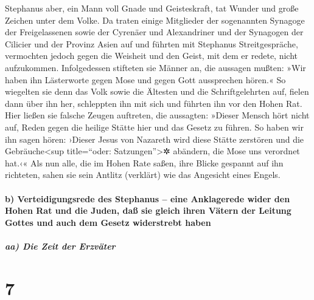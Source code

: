  Stephanus aber, ein Mann voll Gnade und Geisteskraft, tat
Wunder und große Zeichen unter dem Volke.  Da traten
einige Mitglieder der sogenannten Synagoge der Freigelassenen sowie der
Cyrenäer und Alexandriner und der Synagogen der Cilicier und der Provinz
Asien auf und führten mit Stephanus Streitgespräche, 
vermochten jedoch gegen die Weisheit und den Geist, mit dem er redete,
nicht aufzukommen.  Infolgedessen stifteten sie Männer
an, die aussagen mußten: »Wir haben ihn Lästerworte gegen Mose und gegen
Gott aussprechen hören.«  So wiegelten sie denn das Volk
sowie die Ältesten und die Schriftgelehrten auf, fielen dann über ihn
her, schleppten ihn mit sich und führten ihn vor den Hohen Rat.
 Hier ließen sie falsche Zeugen auftreten, die aussagten:
»Dieser Mensch hört nicht auf, Reden gegen die heilige Stätte hier und
das Gesetz zu führen.  So haben wir ihn sagen hören:
›Dieser Jesus von Nazareth wird diese Stätte zerstören und die
Gebräuche\textless sup title=``oder: Satzungen''\textgreater✲ abändern,
die Mose uns verordnet hat.‹«  Als nun alle, die im Hohen
Rate saßen, ihre Blicke gespannt auf ihn richteten, sahen sie sein
Antlitz (verklärt) wie das Angesicht eines Engels.

\hypertarget{b-verteidigungsrede-des-stephanus-eine-anklagerede-wider-den-hohen-rat-und-die-juden-dauxdf-sie-gleich-ihren-vuxe4tern-der-leitung-gottes-und-auch-dem-gesetz-widerstrebt-haben}{%
\paragraph{b) Verteidigungsrede des Stephanus -- eine Anklagerede wider
den Hohen Rat und die Juden, daß sie gleich ihren Vätern der Leitung
Gottes und auch dem Gesetz widerstrebt
haben}\label{b-verteidigungsrede-des-stephanus-eine-anklagerede-wider-den-hohen-rat-und-die-juden-dauxdf-sie-gleich-ihren-vuxe4tern-der-leitung-gottes-und-auch-dem-gesetz-widerstrebt-haben}}

\hypertarget{aa-die-zeit-der-erzvuxe4ter}{%
\subparagraph{aa) Die Zeit der
Erzväter}\label{aa-die-zeit-der-erzvuxe4ter}}

\hypertarget{section-6}{%
\section{7}\label{section-6}}

